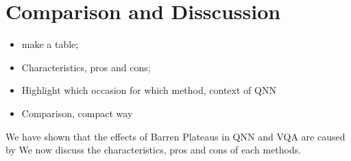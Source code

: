 \section{Comparison and Disscussion}
\begin{itemize}
    \item make a table;
    \item Characteristics, pros and cons;
    \item Highlight which occasion for which method, context of QNN
    \item Comparison, compact way
\end{itemize}

We have shown that the effects of Barren Plateaus in QNN and VQA are caused by 
We now discuss the characteristics, pros and cons of each methods.